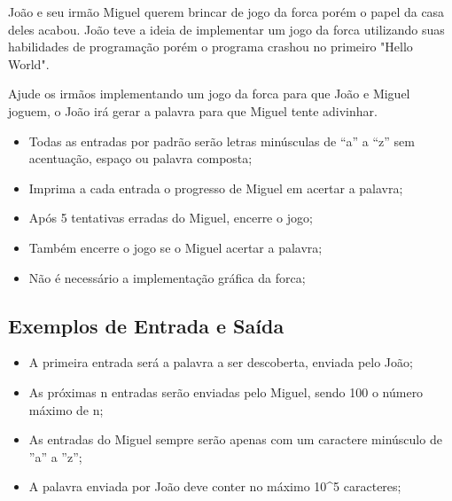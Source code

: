 João e seu irmão Miguel querem brincar de jogo da forca porém o papel da casa deles acabou. João teve a ideia de implementar um jogo da forca utilizando suas habilidades de programação porém o programa crashou no primeiro "Hello World". 

Ajude os irmãos implementando um jogo da forca para que João e Miguel joguem, o João irá gerar a palavra para que Miguel tente adivinhar.

\begin{itemize}

    \item Todas as entradas por padrão serão letras minúsculas de ``a'' a ``z'' sem acentuação, espaço ou palavra composta;

    \item Imprima a cada entrada o progresso de Miguel em acertar a palavra;
    
    \item Após 5 tentativas erradas do Miguel, encerre o jogo;
    
    \item Também encerre o jogo se o Miguel acertar a palavra;
    
    \item Não é necessário a implementação gráfica da forca;
    
\end{itemize}

\subsection*{Exemplos de Entrada e Saída}


\begin{itemize}

    \item A primeira entrada será a palavra a ser descoberta, enviada pelo João;

    \item As próximas n entradas serão enviadas pelo Miguel, sendo 100 o número máximo de n;
    
    \item As entradas do Miguel sempre serão apenas com um caractere minúsculo de ''a'' a ''z'';
    
    
    \item A palavra enviada por João deve conter no máximo 10^5 caracteres;
    

\end{itemize}

